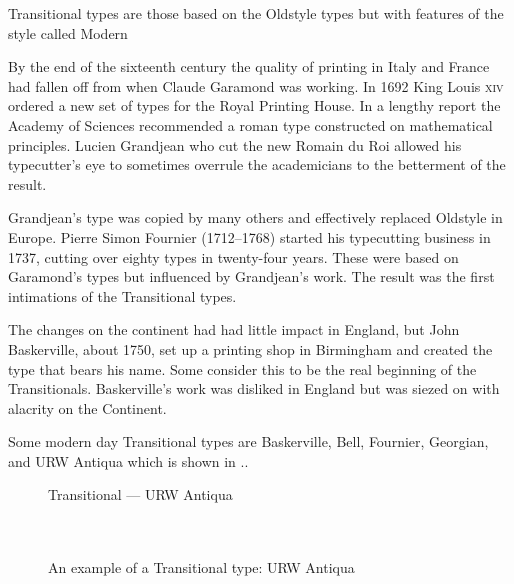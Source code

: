 \documentclass[10pt,a4paper,extrafontsizes]{memoir}
\begin{document}
\begin{paracol}{2}
\switchEng
    Transitional types are those based on the Oldstyle 
types but with features of the style called Modern 

    By the end of the sixteenth century the quality of printing in Italy 
and France had fallen off from when Claude Garamond 
was working. In 1692
King Louis \textsc{xiv} ordered a new set of types for the Royal Printing
House. In a lengthy report the Academy of Sciences recommended a roman type
constructed on mathematical principles. 
Lucien Grandjean who cut the
new Romain du Roi allowed his typecutter's eye to 
sometimes overrule the 
academicians to the betterment of the result.

    Grandjean's type was copied by many others and effectively replaced 
Oldstyle in Europe. Pierre Simon Fournier 
(1712--1768) started his typecutting 
business in 1737, cutting over eighty types in twenty-four years. These were
based on Garamond's types but influenced by Grandjean's work. The result was
the first intimations of the Transitional types.

    The changes on the continent had had little impact in England, but John
Baskerville, about 1750, set up a printing shop 
in Birmingham and created the type that bears his name. Some consider this
to be the real beginning of the Transitionals. Baskerville's work was
disliked in England but was siezed on with alacrity on the Continent.

    Some modern day Transitional types are 
Baskerville, 
Bell, 
Fournier,
Georgian,
and URW Antiqua which is shown in .. 
\end{paracol}

\begin{figure}
\centering
{\centering{}\selectfont
  Transitional --- URW Antiqua \\
  \UCalphabet \\
  \LCalphabet \\
  \fox\par}
\caption{An example of a Transitional type: URW Antiqua} 
   \label{fig:antiqua}
\end{figure}
\end{document}
